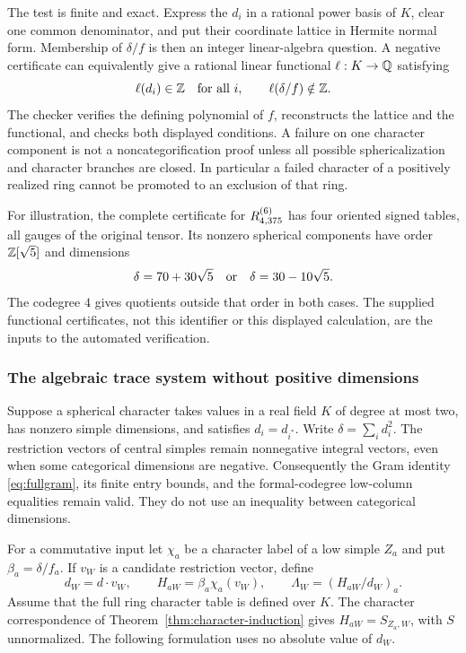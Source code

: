 The test is finite and exact. Express the $d_i$ in a rational power basis
of $K$, clear one common denominator, and put their coordinate lattice
in Hermite normal form. Membership of $\delta/f$ is then an integer
linear-algebra question. A negative certificate can equivalently give a
rational linear functional $\ell:K\to\mathbb Q$ satisfying
\[
 \ell(d_i)\in\mathbb Z\quad\hbox{for all }i,
 \qquad \ell(\delta/f)\notin\mathbb Z.
\]
The checker verifies the defining polynomial of $f$, reconstructs the
lattice and the functional, and checks both displayed conditions. A
failure on one character component is not a noncategorification proof
unless all possible sphericalization and character branches are closed.
In particular a failed character of a positively realized ring cannot
be promoted to an exclusion of that ring.

For illustration, the complete certificate for $R^{(6)}_{4,375}$ has four
oriented signed tables, all gauges of the original tensor. Its nonzero
spherical components have order $\mathbb Z[\sqrt5]$ and dimensions
\[
 \delta=70+30\sqrt5\quad\hbox{or}\quad\delta=30-10\sqrt5.
\]
The codegree $4$ gives quotients outside that order in both cases.
The supplied functional certificates, not this identifier or this
displayed calculation, are the inputs to the automated verification.

\subsubsection{The algebraic trace system without positive dimensions}
Suppose a spherical character takes values in a real field $K$ of degree
at most two, has nonzero simple dimensions, and satisfies
$d_i=d_{i^*}$. Write $\delta=\sum_i d_i^2$. The restriction vectors of
central simples remain nonnegative integral vectors, even when some
categorical dimensions are negative. Consequently the Gram identity
\eqref{eq:fullgram}, its finite entry bounds, and the formal-codegree
low-column equalities remain valid. They do not use an inequality
between categorical dimensions.

For a commutative input let $\chi_a$ be a character label of a low simple
$Z_a$ and put $\beta_a=\delta/f_a$. If $v_W$ is a candidate restriction
vector, define
\[
 d_W=d\cdot v_W,\qquad
 H_{aW}=\beta_a\chi_a(v_W),\qquad
 \Lambda_W=(H_{aW}/d_W)_a.
\]
Assume that the full ring character table is defined over $K$. The
character correspondence of Theorem~\ref{thm:character-induction} gives
$H_{aW}=S_{Z_a,W}$, with $S$ unnormalized. The following formulation
uses no absolute value of $d_W$.


